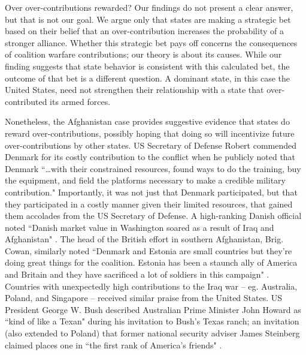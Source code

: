 \documentclass[12pt,letterpaper]{article}
\begin{document}
	Over over-contributions rewarded? Our findings do not present a clear answer, but that is not our goal. We argue only that states are making a strategic bet based on their belief that an over-contribution increases the probability of a stronger alliance. Whether this strategic bet pays off concerns the consequences of coalition warfare contributions; our theory is about its causes. While our finding suggests that state behavior is consistent with this calculated bet, the outcome of that bet is a different question. A dominant state, in this case the United States, need not strengthen their relationship with a state that over-contributed its armed forces. 
			
	Nonetheless, the Afghanistan case provides suggestive evidence that states do reward over-contributions, possibly hoping that doing so will incentivize future over-contributions by other states. US Secretary of Defense Robert \citet{gates_securitydefenseagenda_2011} commended Denmark for its costly contribution to the conflict when he publicly noted that Denmark ``\ldots with their constrained resources, found ways to do the training, buy the equipment, and field the platforms necessary to make a credible military contribution." Importantly, it was not just that Denmark participated, but that they participated in a costly manner given their limited resources, that gained them accolades from the US Secretary of Defense. A high-ranking Danish official noted ``Danish market value in Washington soared as a result of Iraq and Afghanistan" \citep{henriksen_whatdiddenmark_2012}. The head of the British effort in southern Afghanistan, Brig. Cowan, similarly noted ``Denmark and Estonia are small countries but they're doing great things for the coalition. Estonia has been a staunch ally of America and Britain and they have sacrificed a lot of soldiers in this campaign" \citep{druzin_tinyestoniakeen_2009}. Countries with unexpectedly high contributions to the Iraq war -- eg. Australia, Poland, and Singapore -- received similar praise from the United States. US President George W. Bush described Australian Prime Minister John Howard as ``kind of like a Texan" during his invitation to Bush's Texas ranch; an invitation (also extended to Poland) that former national security adviser James Steinberg claimed places one in ``the first rank of America's friends" \citep{sanger_meanwhilebackranch_2003}.
	
\end{document}
